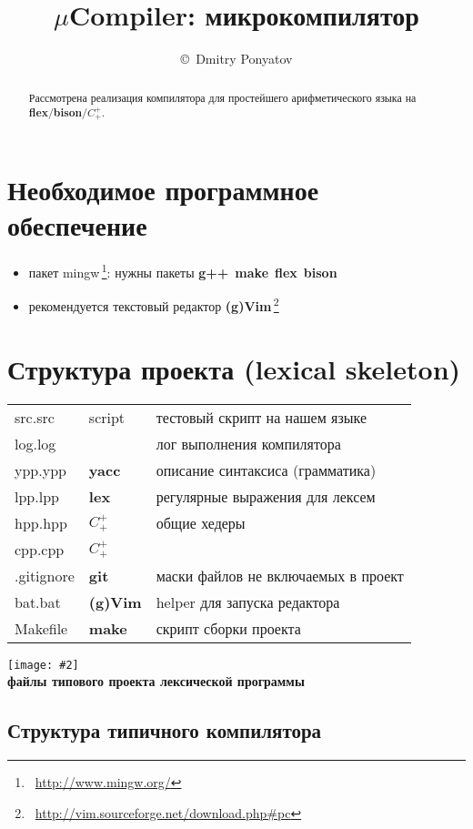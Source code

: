 \documentclass[oneside,10pt]{article}
\title{$\mu$Compiler: микрокомпилятор}
\author{\copyright\ Dmitry Ponyatov \email{dponyatov@gmail.com}}
\newcommand{\fig}[3]{\noindent\texttt{[image: \#2]}\\\textbf{#1}}
\newcommand{\note}[1]{\,\footnote{\ #1}}
\newcommand{\cpp}{$C^+_+$}
\newcommand{\prog}[1]{\textbf{#1}}
\newcommand{\file}[1]{\textit{#1}}
\newcommand{\make}{\prog{make}}
\newcommand{\git}{\prog{git}}
\newcommand{\gvim}{\prog{(g)Vim}}
\newcommand{\flex}{\prog{flex}}
\newcommand{\lex}{\prog{lex}}
\newcommand{\yacc}{\prog{yacc}}
\newcommand{\bison}{\prog{bison}}
\newcommand{\gpp}{\prog{g++}}
\newcommand{\lst}[2]{}
\begin{document}
\maketitle
\begin{abstract}
Рассмотрена реализация компилятора для простейшего арифметического языка на
\flex/\bison/\cpp.
\end{abstract}
\clearpage\tableofcontents\clearpage

\section{Необходимое программное обеспечение}

\begin{itemize}
  \item пакет {mingw}\note{\url{http://www.mingw.org/}}: нужны пакеты
  \gpp\ \make\ \flex\ \bison
  \item рекомендуется текстовый редактор
  \gvim\note{\url{http://vim.sourceforge.net/download.php\#pc}}
\end{itemize}

\section{Структура проекта (lexical skeleton)}\label{skelex}

\begin{tabular}{l l l}
src.src & script & тестовый скрипт на нашем языке \\
log.log & & лог выполнения компилятора \\
ypp.ypp & \yacc & описание синтаксиса (грамматика) \\
lpp.lpp & \lex & регулярные выражения для лексем \\
hpp.hpp & \cpp & общие хедеры \\
cpp.cpp & \cpp & \\
.gitignore & \git & маски файлов не включаемых в проект \\
bat.bat & \gvim & helper для запуска редактора \\
Makefile & \make & скрипт сборки проекта \\
\end{tabular}

\lst{\file{core.src}: ядро компилятора}{doc/core.src}

\fig{файлы типового проекта лексической
программы}{files.pdf}{width=\textwidth}

\subsection{Структура типичного компилятора}
\end{document}
